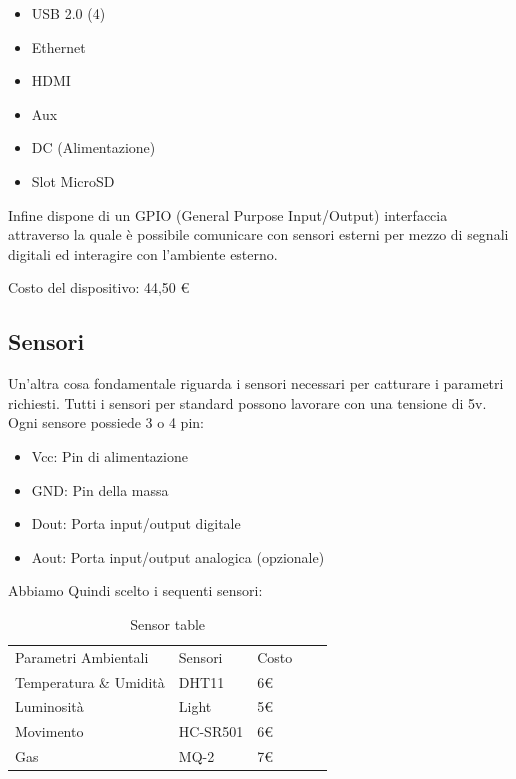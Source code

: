 \begin{itemize}
	\item USB 2.0 (4)
	\item Ethernet
	\item HDMI
	\item Aux
	\item DC (Alimentazione)
	\item Slot MicroSD
\end{itemize}
Infine dispone di un GPIO (General Purpose Input/Output) interfaccia attraverso la quale è possibile comunicare con sensori esterni per mezzo di segnali digitali ed interagire con l'ambiente esterno.

Costo del dispositivo: 44,50 \euro


\subsection{Sensori}

Un'altra cosa fondamentale riguarda i sensori necessari per catturare i parametri richiesti.
Tutti i sensori per standard possono lavorare con una tensione di 5v.
Ogni sensore possiede 3 o 4 pin:

\begin{itemize}
	\item Vcc: Pin di alimentazione
	\item GND: Pin della massa
	\item Dout: Porta input/output digitale
	\item Aout: Porta input/output analogica (opzionale)
\end{itemize}

 Abbiamo Quindi scelto i sequenti sensori:

\begin{table}[]
	
	\begin{tabular}{lllll}
		\cline{1-3}
		\multicolumn{1}{|l|}{Parametri Ambientali} & \multicolumn{1}{l|}{Sensori} & \multicolumn{1}{l|}{Costo} &  &  \\ \cline{1-3}
		Temperatura \& Umidità                     & DHT11                        & 6\euro                          &  &  \\
		Luminosità                                 & Light                        & 5\euro                          &  &  \\
		Movimento                                  & HC-SR501                     & 6\euro                          &  &  \\
		Gas                                  & MQ-2                   & 7\euro                         &  &
	\end{tabular}
	\centering
	\caption{Sensor table}
	\label{my-label}
	
\end{table}

